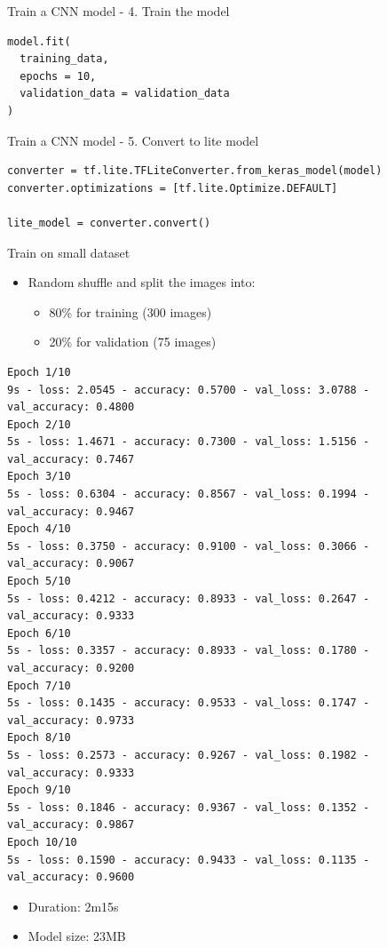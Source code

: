 \begin{frame}[fragile]{Train a CNN model - 4. Train the model}
  \lstset{basicstyle=\ttfamily\small, numbers=left, columns=fullflexible}
  \begin{lstlisting}
model.fit(
  training_data,
  epochs = 10,
  validation_data = validation_data
)
  \end{lstlisting}
\end{frame}

\begin{frame}[fragile]{Train a CNN model - 5. Convert to lite model}
  \lstset{basicstyle=\ttfamily\small, numbers=left, columns=fullflexible}
  \begin{lstlisting}
converter = tf.lite.TFLiteConverter.from_keras_model(model)
converter.optimizations = [tf.lite.Optimize.DEFAULT]

lite_model = converter.convert()
  \end{lstlisting}
\end{frame}

\begin{frame}[fragile]{Train on small dataset}
  \begin{itemize}
	\item Random shuffle and split the images into:
	\begin{itemize}
	  \item 80\% for training (300 images)
	  \item 20\% for validation (75 images)
	\end{itemize}
  \end{itemize}
  \lstset{basicstyle=\tiny, numbers=left}
  \begin{lstlisting}
Epoch 1/10
9s - loss: 2.0545 - accuracy: 0.5700 - val_loss: 3.0788 - val_accuracy: 0.4800
Epoch 2/10
5s - loss: 1.4671 - accuracy: 0.7300 - val_loss: 1.5156 - val_accuracy: 0.7467
Epoch 3/10
5s - loss: 0.6304 - accuracy: 0.8567 - val_loss: 0.1994 - val_accuracy: 0.9467
Epoch 4/10
5s - loss: 0.3750 - accuracy: 0.9100 - val_loss: 0.3066 - val_accuracy: 0.9067
Epoch 5/10
5s - loss: 0.4212 - accuracy: 0.8933 - val_loss: 0.2647 - val_accuracy: 0.9333
Epoch 6/10
5s - loss: 0.3357 - accuracy: 0.8933 - val_loss: 0.1780 - val_accuracy: 0.9200
Epoch 7/10
5s - loss: 0.1435 - accuracy: 0.9533 - val_loss: 0.1747 - val_accuracy: 0.9733
Epoch 8/10
5s - loss: 0.2573 - accuracy: 0.9267 - val_loss: 0.1982 - val_accuracy: 0.9333
Epoch 9/10
5s - loss: 0.1846 - accuracy: 0.9367 - val_loss: 0.1352 - val_accuracy: 0.9867
Epoch 10/10
5s - loss: 0.1590 - accuracy: 0.9433 - val_loss: 0.1135 - val_accuracy: 0.9600
  \end{lstlisting}
  \begin{itemize}
	\item Duration: 2m15s
	\item Model size: 23MB
  \end{itemize}
\end{frame}

